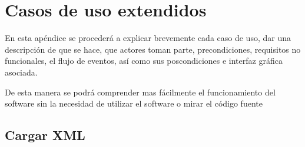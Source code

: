 \chapter{Casos de uso extendidos}
En esta ap\'endice se proceder\'a a explicar brevemente cada caso de uso, dar una descripci\'on
de que se hace, que actores toman parte, precondiciones, requisitos no funcionales, el flujo de
eventos, as\'i como sus poscondiciones e interfaz gr\'afica asociada.

De esta manera se podr\'a comprender mas f\'acilmente el funcionamiento del software
sin la necesidad de utilizar el software o mirar el c\'odigo fuente

\section{Cargar XML}

